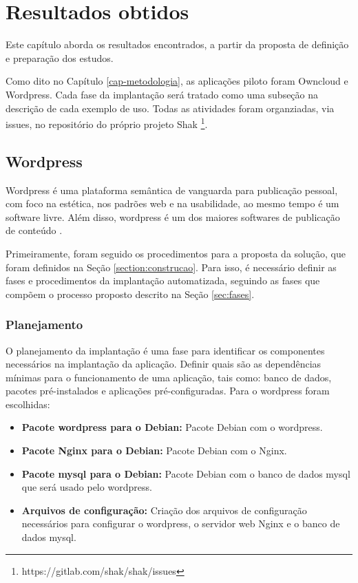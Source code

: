 \chapter{Resultados obtidos}
\label{cap-resultados}
Este capítulo aborda os resultados encontrados, a partir da proposta de
definição e preparação dos estudos. 

Como dito no Capítulo \ref{cap-metodologia}, as aplicações piloto foram Owncloud e Wordpress. 
Cada fase da implantação será tratado como uma 
subseção na descrição de cada exemplo de uso. Todas as atividades foram organziadas,
via issues, no repositório do próprio projeto Shak 
\footnote{https://gitlab.com/shak/shak/issues}.

\section{Wordpress}
\label{sub:wordpress}

Wordpress é uma plataforma semântica de vanguarda para publicação pessoal, 
com foco na estética, nos padrões web e na usabilidade, ao mesmo tempo é 
um software livre. Além disso, wordpress é um dos maiores softwares de 
publicação de conteúdo \cite{wordpress}. 

Primeiramente, foram seguido os procedimentos para a proposta da solução, que foram
 definidos na Seção \ref{section:construcao}. Para isso, é
necessário definir as fases e procedimentos da implantação automatizada,
seguindo as fases que compõem o processo proposto descrito na Seção \ref{sec:fases}.

\subsection{Planejamento}

O planejamento da implantação é uma fase para identificar os componentes
necessários na implantação da aplicação. Definir quais são as dependências mínimas
para o funcionamento de uma aplicação, tais como: banco de dados, pacotes
pré-instalados e aplicações pré-configuradas. Para o wordpress foram escolhidas:

\begin{itemize}
   \item \textbf{Pacote wordpress para o Debian:} Pacote Debian com o wordpress.
   \item \textbf{Pacote Nginx para o Debian:} Pacote Debian com o Nginx.
   \item \textbf{Pacote mysql para o Debian:} Pacote Debian com o banco de dados mysql
   que será usado pelo wordpress.
   \item \textbf{Arquivos de configuração:} Criação dos arquivos de configuração
   necessários para configurar o wordpress, o servidor web Nginx e o banco de dados
   mysql.
\end{itemize}

